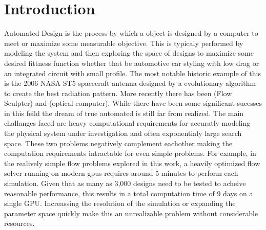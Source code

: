 \documentclass{article} %
\begin{document}
\begin{abstract}

\end{abstract}

\section{Introduction}

Automated Design is the process by which a object is designed by a computer to meet or maximize some measurable objective. This is typicaly performed by modeling the system and then exploring the space of designs to maximize some desired fittness function whether that be automotive car styling with low drag or an integrated circuit with small profile. The most notable historic example of this is the 2006 NASA ST5 spacecraft antenna designed by a evolutionary algorithm to create the best radiation pattern. More recently there has been (Flow Sculpter) and (optical computer). While there have been some significant sucesses in this feild the dream of true automated is still far from realized. The main challanges faced are heavy computational requirements for accuratly modeling the physical system under investigation and often exponentialy large search space. These two problems negatively complement eachother making the computation requirements intractable for even simple problems. For example, in the realively simple flow problems explored in this work, a heavily optimized flow solver running on modern gpus requires around 5 minutes to perform each simulation. Given that as many as 3,000 designs need to be tested to acheive reasonable performance, this results in a total computation time of 9 days on a single GPU. Increassing the resolution of the simulation or expanding the parameter space quickly make this an unrealizable problem without considerable resources.
\end{document}
